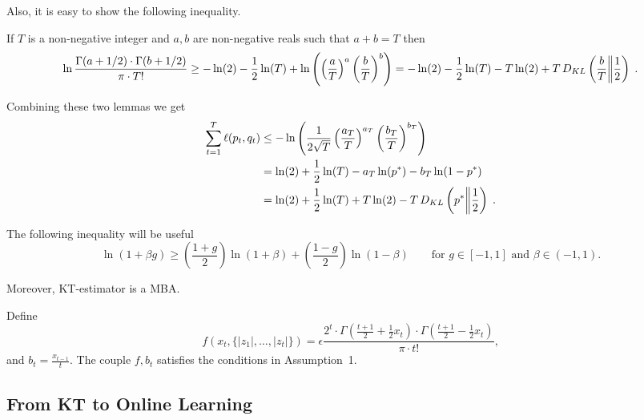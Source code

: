 Also, it is easy to show the following inequality.
\begin{lemma}
\label{lemma:approx_gamma}
If $T$ is a non-negative integer and $a,b$ are non-negative reals such that $a +
b = T$ then
$$
\ln \frac{\Gamma(a + 1/2) \cdot \Gamma(b + 1/2)}{\pi \cdot T!} 
\geq -\ln(2) -\frac{1}{2} \ln(T) +\ln \left(\left( \frac{a}{T} \right)^a \left( \frac{b}{T} \right)^b\right) 
= -\ln(2) -\frac{1}{2} \ln(T) -T \ln (2) + T \, D_{KL}\left(\frac{b}{T}\middle\|\frac{1}{2}\right)\; .
$$
\end{lemma}

Combining these two lemmas we get
\begin{align*}
\sum_{t=1}^T \ell(p_t, q_t)
& \le - \ln \left( \frac{1}{2\sqrt{T}} \left( \frac{a_T}{T} \right)^{a_T} \left( \frac{b_T}{T} \right)^{b_T} \right) \\
& = \ln(2) + \frac{1}{2} \ln(T) - a_T \ln (p^*) - b_T \ln (1-p^*) \\
& = \ln(2) + \frac{1}{2} \ln(T) + T \ln (2) -T \, D_{KL}\left(p^*\middle\|\frac{1}{2}\right) \; .
\end{align*}

The following inequality will be useful
$$
\ln\left(1 + \beta g \right) \ge \left( \frac{1+g}{2} \right) \ln \left(1 + \beta\right) + \left( \frac{1-g}{2} \right) \ln \left(1 - \beta \right)
\qquad \text{for $g \in [-1,1]$ and $\beta \in (-1,1)$}.
$$

Moreover, \ac{KT}-estimator is a \ac{MBA}.
\begin{theorem}
\label{theo:kt_is_mba}
Define 
\[
f\left( x_{t}, \{|z_1|, \ldots, |z_{t}|\}\right) 
= \epsilon  \frac{2^t \cdot \Gamma \left(\frac{t+1}{2} + \frac{1}{2} x_{t} \right) \cdot \Gamma \left(\frac{t+1}{2} - \frac{1}{2} x_{t} \right)}{\pi \cdot t!},
\]
and $b_t= \frac{x_{t-1}}{t}$.
The couple $f,b_t$ satisfies the conditions in Assumption~1.
\end{theorem}



\subsection{From KT to Online Learning}

